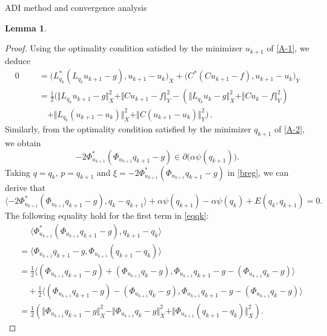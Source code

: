\documentclass[11pt]{article}%
\renewcommand{\_}{{\fontfamily{ptm}\selectfont\textunderscore}}
\theoremstyle{plain}
\numberwithin{equation}{section}
\newtheorem{lemma}{Lemma}
\newcommand{\R}{\mathbb{R}}
\newcommand{\ds}{\displaystyle}
\def\rt{\right} \def\lt{\left}
\def\ra{\rangle} \def\la{\langle}
\newcommand{\q}{\quad}   \newcommand{\qq}{\qquad} \def\R{{\mathbb R}} \def\l{\label}
\begin{document}
\begin{section}{ADI method and convergence analysis}
\begin{lemma}
\end{lemma}
\begin{proof}
Using the optimality condition satisfied by the minimizer $u_{k+1}$ of \eqref{A-1}, we deduce
\begin{align}
0&=\big(L_{q_k}^*(L_{q_k}u_{k+1}-g),u_{k+1}-u_{k}\big)_X+\big(C^*(Cu_{k+1}-f),u_{k+1}-u_{k}\big)_Y
\nonumber \\ 
 \ds\q &=\frac{1}{2}\Big(\Vert L_{q_k}u_{k+1}-g\Vert_X^2+\Vert Cu_{k+1}-f\Vert_Y^2
-\lt(\Vert L_{q_k}u_{k}-g\Vert_X^2+\Vert Cu_{k}-f\Vert_Y^2\rt) \nonumber\\ 
\ds\q\q &\q+\Vert L_{q_k}(u_{k+1}-u_{k})\Vert_X^2+\Vert C(u_{k+1}-u_{k})\Vert_Y^2\Big)\,.\label{uq1}
\end{align} 
Similarly, from the optimality condition satisfied by the minimizer $q_{k+1}$ of \eqref{A-2}, we obtain 
\begin{equation*}
-2\Phi_{u_{k+1}}^*(\Phi_{u_{k+1}} q_{k+1}-g) \in \partial\big(\alpha\psi(q_{k+1})\big).
\end{equation*}
 Taking $q=q_k$, $p=q_{k+1}$ and 
$\xi = -2\Phi_{u_{k+1}}^*(\Phi_{u_{k+1}} q_{k+1}-g)$ in \eqref{breg}, we can derive that 
\begin{equation}
\la-2\Phi_{u_{k+1}}^*(\Phi_{u_{k+1}} q_{k+1}-g), q_{k}-q_{k+1}\ra +\alpha\psi(q_{k+1})-\alpha\psi(q_{k})+E(q_{k},q_{k+1}) = 0. \label{eqqk}
\end{equation}
 The following equality hold for the first term in \eqref{eqqk}:
\begin{align}
&\, \, \quad\la\Phi_{u_{k+1}}^*(\Phi_{u_{k+1}} q_{k+1}-g),q_{k+1}-q_{k}\ra \nonumber\\
&=\la\Phi_{u_{k+1}} q_{k+1}-g,\Phi_{u_{k+1}}(q_{k+1}-q_{k})\ra \nonumber\\
&=\frac{1}{2}\la(\Phi_{u_{k+1}} q_{k+1}-g)+(\Phi_{u_{k+1}} q_{k}-g),\Phi_{u_{k+1}}q_{k+1}-g-(\Phi_{u_{k+1}}q_{k}-g)\ra \nonumber\\
&\quad +\frac{1}{2}\la(\Phi_{u_{k+1}} q_{k+1}-g)-(\Phi_{u_{k+1}} q_{k}-g),\Phi_{u_{k+1}}q_{k+1}-g-(\Phi_{u_{k+1}}q_{k}-g)\ra \nonumber\\
&=\frac{1}{2}\left(\Vert \Phi_{u_{k+1}} q_{k+1}-g\Vert_X^2-\Vert \Phi_{u_{k+1}} q_{k}-g\Vert_X^2+\Vert \Phi_{u_{k+1}}(q_{k+1}-q_{k})\Vert_X^2\right).\label{qqk}
\end{align}


\end{proof}
\end{section}
\end{document}
